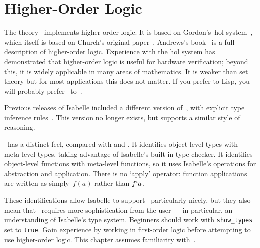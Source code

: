 \chapter{Higher-Order Logic}

The theory~ implements higher-order logic.
It is based on Gordon's~{\sc hol} system~\cite{mgordon-hol}, which itself is
based on Church's original paper~\cite{church40}.  Andrews's
book~\cite{andrews86} is a full description of higher-order logic.
Experience with the {\sc hol} system has demonstrated that higher-order
logic is useful for hardware verification; beyond this, it is widely
applicable in many areas of mathematics.  It is weaker than {\ZF} set
theory but for most applications this does not matter.  If you prefer {\ML}
to Lisp, you will probably prefer \HOL\ to~{\ZF}.

Previous releases of Isabelle included a different version of~\HOL, with
explicit type inference rules~\cite{paulson-COLOG}.  This version no longer
exists, but  supports a similar style of reasoning.

\HOL\ has a distinct feel, compared with {\ZF} and {\CTT}.  It
identifies object-level types with meta-level types, taking advantage of
Isabelle's built-in type checker.  It identifies object-level functions
with meta-level functions, so it uses Isabelle's operations for abstraction
and application.  There is no `apply' operator: function applications are
written as simply~$f(a)$ rather than $f{\tt`}a$.

These identifications allow Isabelle to support \HOL\ particularly nicely,
but they also mean that \HOL\ requires more sophistication from the user
--- in particular, an understanding of Isabelle's type system.  Beginners
should work with {\tt show_types} set to {\tt true}.  Gain experience by
working in first-order logic before attempting to use higher-order logic.
This chapter assumes familiarity with~{\FOL{}}.


